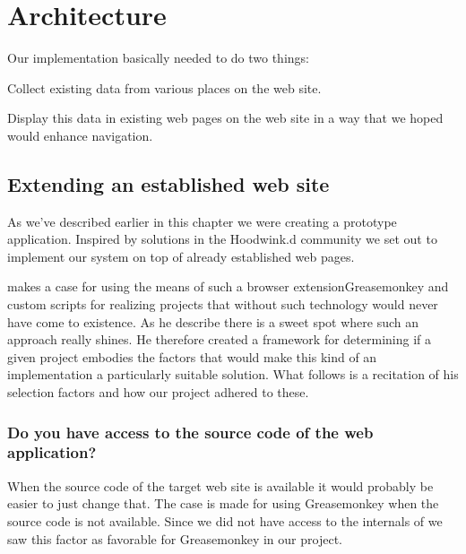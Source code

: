 \section{Architecture}
\label{section:implementation.architecture}

Our implementation basically needed to do two things:

\begin{enum}
  \item Collect existing data from various places on the \urort{} web site.
  \item Display this data in existing web pages on the \urort{} web site in
    a way that we hoped would enhance navigation.
\end{enum}

\subsection{Extending an established web site}

As we've described earlier in this chapter we were creating a prototype
application. Inspired by solutions in the Hoodwink.d community we set
out to implement our system on top of already established web pages.

\citet{laird07} makes a case for using the means of such a browser
extension\dash{}Greasemonkey%
\dash{}and custom scripts for
realizing projects that without such technology would
never have come to existence. As he describe there is a sweet spot where such
an approach really shines. He therefore created a framework for determining
if a given project embodies the factors that would make this kind of an
implementation a particularly suitable solution. What follows is a recitation
of his selection factors and how our project adhered to these.

\subsubsection{Do you have access to the source code of the web application?}

When the source code of the target web site is available it would probably
be easier to just change that. The case is made for using Greasemonkey when
the source code is not available. Since we did not have access to the
internals of \urort{} we saw this factor as favorable for Greasemonkey in our
project.

